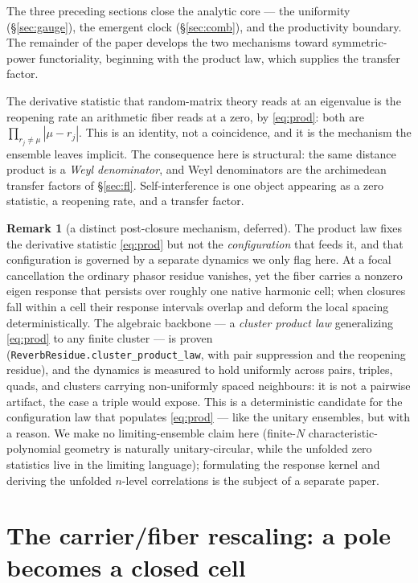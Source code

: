 \documentclass[11pt]{article}
\theoremstyle{definition}
\newtheorem{remark}[theorem]{Remark}
\begin{document}
The three preceding sections close the analytic core --- the uniformity (\S\ref{sec:gauge}), the
emergent clock (\S\ref{sec:comb}), and the productivity boundary. The remainder of the paper develops
the two mechanisms toward symmetric-power functoriality, beginning with the product law, which supplies
the transfer factor.

The derivative statistic that random-matrix theory reads at an eigenvalue is the reopening rate an
arithmetic fiber reads at a zero, by \eqref{eq:prod}: both are $\prod_{r_j\neq\mu}|\mu-r_j|$. This is
an identity, not a coincidence, and it is the mechanism the ensemble leaves implicit. The consequence
here is structural: the same distance product is a \emph{Weyl denominator}, and Weyl denominators are
the archimedean transfer factors of \S\ref{sec:fl}. Self-interference is one object appearing as a
zero statistic, a reopening rate, and a transfer factor.

\begin{remark}[a distinct post-closure mechanism, deferred]\label{rem:reverb}
The product law fixes the derivative statistic \eqref{eq:prod} but not the \emph{configuration} that
feeds it, and that configuration is governed by a separate dynamics we only flag here. At a focal
cancellation the ordinary phasor residue vanishes, yet the fiber carries a nonzero eigen response that
persists over roughly one native harmonic cell; when closures fall within a cell their response
intervals overlap and deform the local spacing deterministically. The algebraic backbone --- a
\emph{cluster product law} generalizing \eqref{eq:prod} to any finite cluster --- is proven
(\texttt{ReverbResidue.cluster\_product\_law}, with pair suppression and the reopening residue), and
the dynamics is measured to hold uniformly across pairs, triples, quads, and clusters carrying
non-uniformly spaced neighbours: it is not a pairwise artifact, the case a triple would expose. This is
a deterministic candidate for the configuration law that populates \eqref{eq:prod} --- like the
unitary ensembles, but with a reason. We make no limiting-ensemble claim here (finite-$N$
characteristic-polynomial geometry is naturally unitary-circular, while the unfolded zero statistics
live in the limiting language); formulating the response kernel and deriving the unfolded $n$-level
correlations is the subject of a separate paper.
\end{remark}

\section{The carrier/fiber rescaling: a pole becomes a closed cell}\label{sec:carrier}
\end{document}
